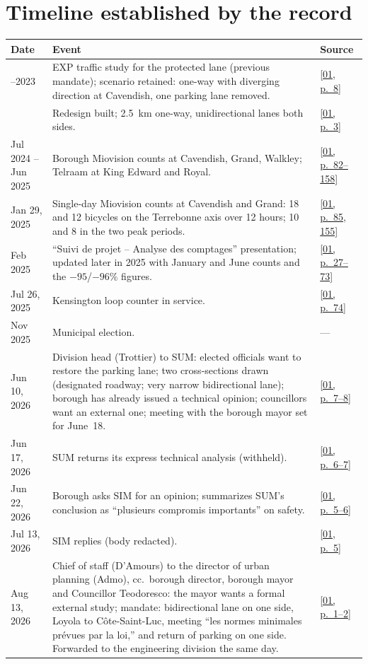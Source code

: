 \documentclass[11pt,letterpaper]{article}
\newcommand{\pagesurl}{https://openmobilitydata.github.io/Terrebonne-access-requests}
\newcommand{\pgl}[3]{\href{\pagesurl/\csname bundle#1\endcsname\#page=#2}{\textsf{\small[#1, p.~#3]}}}
\newcommand{\pg}[2]{\pgl{#1}{#2}{#2}}
\begin{document}
\section{Timeline established by the record}

\begin{small}
\begin{longtable}{>{\raggedright\arraybackslash}p{2.6cm}>{\raggedright\arraybackslash}p{10.2cm}>{\raggedright\arraybackslash}p{2.0cm}}
\toprule
Date & Event & Source \\
\midrule
\endhead
2022--2023 & EXP traffic study for the protected lane (previous mandate); scenario retained: one-way with diverging direction at Cavendish, one parking lane removed. & \pg{01}{8} \\
2024 & Redesign built; 2.5~km one-way, unidirectional lanes both sides. & \pg{01}{3} \\
Jul 2024 -- Jun 2025 & Borough Miovision counts at Cavendish, Grand, Walkley; Telraam at King Edward and Royal. & \pgl{01}{82}{82--158} \\
Jan 29, 2025 & Single-day Miovision counts at Cavendish and Grand: 18 and 12 bicycles on the Terrebonne axis over 12 hours; 10 and 8 in the two peak periods. & \pgl{01}{85}{85, 155} \\
Feb 2025 & ``Suivi de projet -- Analyse des comptages'' presentation; updated later in 2025 with January and June counts and the $-95$/$-96$\% figures. & \pgl{01}{27}{27--73} \\
Jul 26, 2025 & Kensington loop counter in service. & \pg{01}{74} \\
Nov 2025 & Municipal election. & --- \\
Jun 10, 2026 & Division head (Trottier) to SUM: elected officials want to restore the parking lane; two cross-sections drawn (designated roadway; very narrow bidirectional lane); borough has already issued a technical opinion; councillors want an external one; meeting with the borough mayor set for June~18. & \pgl{01}{7}{7--8} \\
Jun 17, 2026 & SUM returns its express technical analysis (withheld). & \pgl{01}{6}{6--7} \\
Jun 22, 2026 & Borough asks SIM for an opinion; summarizes SUM's conclusion as ``plusieurs compromis importants'' on safety. & \pgl{01}{5}{5--6} \\
Jul 13, 2026 & SIM replies (body redacted). & \pg{01}{5} \\
Aug 13, 2026 & Chief of staff (D'Amours) to the director of urban planning (Admo), cc.\ borough director, borough mayor and Councillor Teodoresco: the mayor wants a formal external study; mandate: bidirectional lane on one side, Loyola to C\^ote-Saint-Luc, meeting ``les normes minimales pr\'evues par la loi,'' and return of parking on one side. Forwarded to the engineering division the same day. & \pgl{01}{1}{1--2} \\

\end{longtable}
\end{small}
\end{document}
